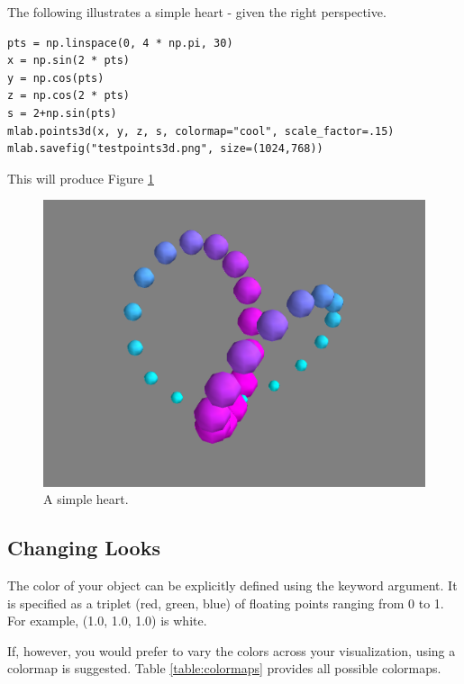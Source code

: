 The following illustrates a simple heart - given the right perspective. 
\begin{lstlisting}
pts = np.linspace(0, 4 * np.pi, 30)
x = np.sin(2 * pts)
y = np.cos(pts)
z = np.cos(2 * pts)
s = 2+np.sin(pts)
mlab.points3d(x, y, z, s, colormap="cool", scale_factor=.15)
mlab.savefig("testpoints3d.png", size=(1024,768))
\end{lstlisting}
This will produce Figure \ref{fig:points3d}

\begin{figure} 
\includegraphics[width=\textwidth]{points3d.png}
\caption{A simple heart.} 
\label{fig:points3d}
\end{figure}

\subsection*{Changing Looks}
The color of your object can be explicitly defined using the  
keyword argument. It is specified as a triplet (red, green, blue) of 
floating points ranging from 0 to 1. 
For example, (1.0, 1.0, 1.0) is white. 

If, however, you would prefer to vary the colors across your visualization, 
using a colormap is suggested. Table \ref{table:colormaps} provides 
all possible colormaps. 

